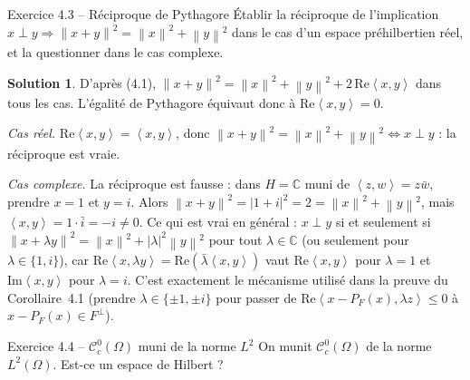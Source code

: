 \documentclass[11pt,a4paper]{article}
\newcommand{\C}{\mathbb{C}}
\newcommand{\norm}[1]{\left\|#1\right\|}
\newcommand{\Cc}{\mathcal{C}^0_c}
\newcommand{\ps}[2]{\left\langle #1,#2\right\rangle}
\theoremstyle{definition}
\newtheorem*{solution}{Solution}
\begin{document}
\begin{exo}{Exercice 4.3 -- Réciproque de Pythagore}
Établir la réciproque de l'implication $x\perp y\Rightarrow\norm{x+y}^2=\norm x^2+\norm y^2$ dans le cas d'un espace préhilbertien réel, et la questionner dans le cas complexe.
\end{exo}

\begin{solution}
D'après (4.1), $\norm{x+y}^2=\norm x^2+\norm y^2+2\,\mathrm{Re}\ps xy$ dans tous les cas. L'égalité de Pythagore équivaut donc à $\mathrm{Re}\ps xy=0$.

\emph{Cas réel.} $\mathrm{Re}\ps xy=\ps xy$, donc $\norm{x+y}^2=\norm x^2+\norm y^2\iff x\perp y$ : la réciproque est vraie.

\emph{Cas complexe.} La réciproque est fausse : dans $H=\C$ muni de $\ps zw=z\bar w$, prendre $x=1$ et $y=i$. Alors $\norm{x+y}^2=|1+i|^2=2=\norm x^2+\norm y^2$, mais $\ps xy=1\cdot\bar i=-i\ne0$. Ce qui est vrai en général : $x\perp y$ si et seulement si $\norm{x+\lambda y}^2=\norm x^2+|\lambda|^2\norm y^2$ pour tout $\lambda\in\C$ (ou seulement pour $\lambda\in\{1,i\}$), car $\mathrm{Re}\ps x{\lambda y}=\mathrm{Re}(\bar\lambda\ps xy)$ vaut $\mathrm{Re}\ps xy$ pour $\lambda=1$ et $\mathrm{Im}\ps xy$ pour $\lambda=i$. C'est exactement le mécanisme utilisé dans la preuve du Corollaire~4.1 (prendre $\lambda\in\{\pm1,\pm i\}$ pour passer de $\mathrm{Re}\ps{x-P_F(x)}{\lambda z}\le0$ à $x-P_F(x)\in F^\perp$).
\end{solution}

\begin{exo}{Exercice 4.4 -- $\Cc(\Omega)$ muni de la norme $L^2$}
On munit $\Cc(\Omega)$ de la norme $L^2(\Omega)$. Est-ce un espace de Hilbert ?
\end{exo}
\end{document}
